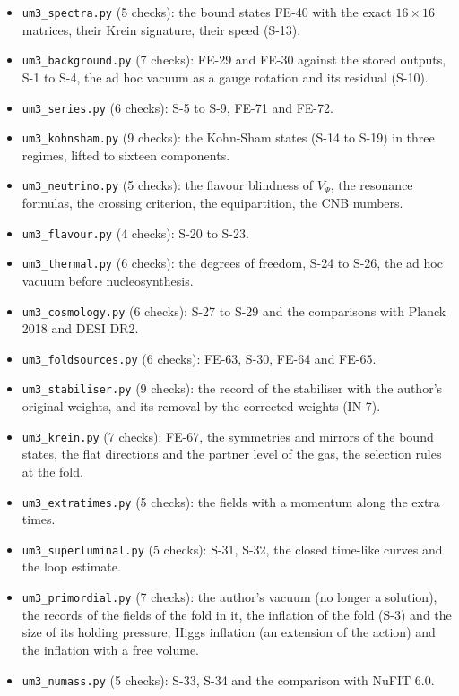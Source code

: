 \documentclass[
  10pt,
]{article}
\begin{document}
\begin{itemize}
  anomalies with three right-handed neutrinos.
\item
  \texttt{um3\_spectra.py} (5 checks): the bound states FE-40 with the
  exact \(16 \times 16\) matrices, their Krein signature, their speed
  (S-13).
\item
  \texttt{um3\_background.py} (7 checks): FE-29 and FE-30 against the
  stored outputs, S-1 to S-4, the ad hoc vacuum as a gauge rotation and
  its residual (S-10).
\item
  \texttt{um3\_series.py} (6 checks): S-5 to S-9, FE-71 and FE-72.
\item
  \texttt{um3\_kohnsham.py} (9 checks): the Kohn-Sham states (S-14 to
  S-19) in three regimes, lifted to sixteen components.
\item
  \texttt{um3\_neutrino.py} (5 checks): the flavour blindness of
  \(V_\Psi\), the resonance formulas, the crossing criterion, the
  equipartition, the CNB numbers.
\item
  \texttt{um3\_flavour.py} (4 checks): S-20 to S-23.
\item
  \texttt{um3\_thermal.py} (6 checks): the degrees of freedom, S-24 to
  S-26, the ad hoc vacuum before nucleosynthesis.
\item
  \texttt{um3\_cosmology.py} (6 checks): S-27 to S-29 and the
  comparisons with Planck 2018 and DESI DR2.
\item
  \texttt{um3\_foldsources.py} (6 checks): FE-63, S-30, FE-64 and FE-65.
\item
  \texttt{um3\_stabiliser.py} (9 checks): the record of the stabiliser
  with the author's original weights, and its removal by the corrected
  weights (IN-7).
\item
  \texttt{um3\_krein.py} (7 checks): FE-67, the symmetries and mirrors
  of the bound states, the flat directions and the partner level of the
  gas, the selection rules at the fold.
\item
  \texttt{um3\_extratimes.py} (5 checks): the fields with a momentum
  along the extra times.
\item
  \texttt{um3\_superluminal.py} (5 checks): S-31, S-32, the closed
  time-like curves and the loop estimate.
\item
  \texttt{um3\_primordial.py} (7 checks): the author's vacuum (no longer
  a solution), the records of the fields of the fold in it, the
  inflation of the fold (S-3) and the size of its holding pressure,
  Higgs inflation (an extension of the action) and the inflation with a
  free volume.
\item
  \texttt{um3\_numass.py} (5 checks): S-33, S-34 and the comparison with
  NuFIT 6.0.
\end{itemize}
\end{document}
